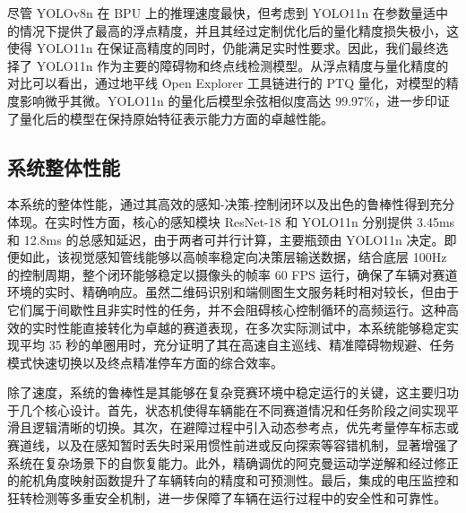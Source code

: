 \documentclass[UTF8]{ctexart}
\begin{document}
\begin{table}[htbp]
    \centering
    \caption{目标检测模型性能对比}
    \label{tab:object_detection_performance}
\end{table}

尽管 YOLOv8n \cite{ultralyticsYOLOv8Docs}在 BPU 上的推理速度最快，但考虑到 YOLO11n 在参数量适中的情况下提供了最高的浮点精度，并且其经过定制优化后的量化精度损失极小，这使得 YOLO11n 在保证高精度的同时，仍能满足实时性要求。因此，我们最终选择了 YOLO11n 作为主要的障碍物和终点线检测模型。从浮点精度与量化精度的对比可以看出，通过地平线 Open Explorer 工具链进行的 PTQ 量化，对模型的精度影响微乎其微。YOLO11n 的量化后模型余弦相似度高达 99.97\%，进一步印证了量化后的模型在保持原始特征表示能力方面的卓越性能。

\subsection{系统整体性能}
本系统的整体性能，通过其高效的感知-决策-控制闭环以及出色的鲁棒性得到充分体现。在实时性方面，核心的感知模块 ResNet-18 和 YOLO11n 分别提供 3.45ms 和 12.8ms 的总感知延迟，由于两者可并行计算，主要瓶颈由 YOLO11n 决定。即便如此，该视觉感知管线能够以高帧率稳定向决策层输送数据，结合底层 100Hz 的控制周期，整个闭环能够稳定以摄像头的帧率 60 FPS 运行，确保了车辆对赛道环境的实时、精确响应。虽然二维码识别和端侧图生文服务耗时相对较长，但由于它们属于间歇性且非实时性的任务，并不会阻碍核心控制循环的高频运行。这种高效的实时性能直接转化为卓越的赛道表现，在多次实际测试中，本系统能够稳定实现平均 35 秒的单圈用时，充分证明了其在高速自主巡线、精准障碍物规避、任务模式快速切换以及终点精准停车方面的综合效率。

除了速度，系统的鲁棒性是其能够在复杂竞赛环境中稳定运行的关键，这主要归功于几个核心设计。首先，状态机使得车辆能在不同赛道情况和任务阶段之间实现平滑且逻辑清晰的切换。其次，在避障过程中引入动态参考点，优先考量停车标志或赛道线，以及在感知暂时丢失时采用惯性前进或反向探索等容错机制，显著增强了系统在复杂场景下的自恢复能力。此外，精确调优的阿克曼运动学逆解和经过修正的舵机角度映射函数提升了车辆转向的精度和可预测性。最后，集成的电压监控和狂转检测等多重安全机制，进一步保障了车辆在运行过程中的安全性和可靠性。
\end{document}
